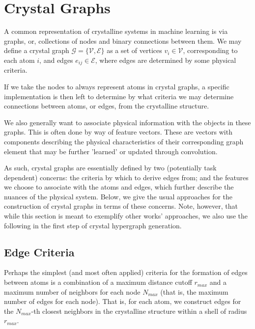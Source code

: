 \documentclass[10pt,a4paper]{article}
\begin{document}
\section{Crystal Graphs}
A common representation of crystalline systems in machine learning is via graphs, or, collections of nodes and binary connections between them. We may define a crystal graph $\mathcal{G}=\lbrace \mathcal{V},\mathcal{E}\rbrace$ as a set of vertices $v_i\in\mathcal{V}$, corresponding to each atom $i$, and edges $e_{ij}\in\mathcal{E}$, where edges are determined by some physical criteria.

If we take the nodes to always represent atoms in crystal graphs, a specific implementation is then left to determine by what criteria we may determine connections between atoms, or edges, from the crystalline structure. 

We also generally want to associate physical information with the objects in these graphs. This is often done by way of feature vectors. These are vectors with components describing the physical characteristics of their corresponding graph element that may be further 'learned' or updated through convolution.

As such, crystal graphs are essentially defined by two (potentially task dependent) concerns: the criteria by which to derive edges from; and the features we choose to associate with the atoms and edges, which further describe the nuances of the physical system. Below, we give the usual approaches for the construction of crystal graphs in terms of these concerns. Note, however, that while this section is meant to exemplify other works' approaches, we also use the following in the first step of crystal hypergraph generation.

\subsection{Edge Criteria}
Perhaps the simplest (and most often applied) criteria for the formation of edges between atoms is a combination of a maximum distance cutoff $r_{max}$ and a maximum number of neighbors for each node $N_{max}$ (that is, the maximum number of edges for each node). That is, for each atom, we construct edges for the $N_{max}$-th closest neighbors in the crystalline structure within a shell of radius $r_{max}$.
\end{document}

